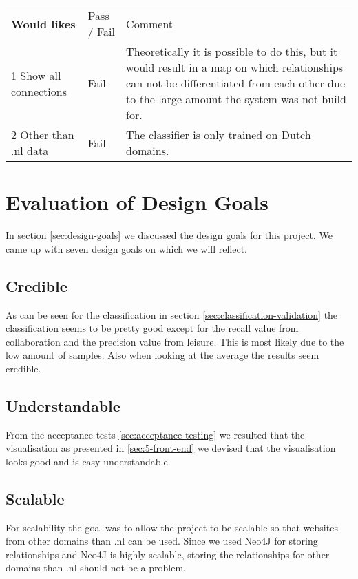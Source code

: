 \begin{table}[H]
\begin{tabular}{ll m{8cm}}
\textbf{Would likes}                    & Pass / Fail & Comment                                                                                                                                                                                                                               \\
1 Show all connections         & Fail        & Theoretically it is possible to do this, but it would result in a map on which relationships can not be differentiated from each other due to the large amount the system was not build for. \\ \hline
2 Other than .nl data          & Fail        & The classifier is only trained on Dutch domains.                                                                 
\end{tabular}
\end{table}

\section{Evaluation of Design Goals}
In section \ref{sec:design-goals} we discussed the design goals for this project. We came up with seven design goals on which we will reflect.

\subsection{Credible}
As can be seen for the classification in section \ref{sec:classification-validation} the classification seems to be pretty good except for the recall value from collaboration and the precision value from leisure. This is most likely due to the low amount of samples. Also when looking at the average the results seem credible.

\subsection{Understandable}
From the acceptance tests \ref{sec:acceptance-testing} we resulted that the visualisation as presented in \ref{sec:5-front-end} we devised that the visualisation looks good and is easy understandable.

\subsection{Scalable}
For scalability the goal was to allow the project to be scalable so that websites from other domains than .nl can be used. Since we used Neo4J for storing relationships and Neo4J is highly scalable, storing the relationships for other domains than .nl should not be a problem. 


